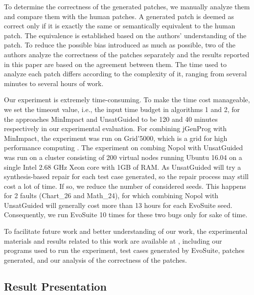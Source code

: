 \documentclass[]{sig-alternate}
\begin{document}
To determine the correctness of the generated patches, we manually analyze them and compare them with the human patches. A generated patch is deemed as correct only if it is exactly the same or semantically equivalent to the human patch. The equivalence is established based on the authors' understanding of the patch. To reduce the possible bias introduced as much as possible, two of the authors analyze the correctness of the patches separately and the results reported in this paper are based on the agreement between them. The time used to analyze each patch differs according to the complexity of it, ranging from several minutes to several hours of work. 

Our experiment is extremely time-consuming. To make the time cost manageable, we set the timeout value, i.e., the input time budget in algorithms 1 and 2, for the approaches MinImpact and UnsatGuided to be 120 and 40 minutes respectively in our experimental evaluation. For combining jGenProg with MinImpact, the experiment was run on Grid’5000, which is a grid for high performance computing \cite{bolze2006grid}. The experiment on combing Nopol with UnsatGuided was run on a cluster consisting of 200 virtual nodes running Ubuntu 16.04 on a single Intel 2.68 GHz Xeon core with 1GB of RAM. As UnsatGuided will try a synthesis-based repair for each test case generated, so the repair process may still cost a lot of time. If so, we reduce the number of considered seeds. This happens for 2 faults (Chart\_26 and Math\_24), for which combining Nopol with UnsatGuided will generally cost more than 13 hours for each EvoSuite seed. Consequently, we run EvoSuite 10 times for these two bugs only for sake of time.

To facilitate future work and better understanding of our work, the experimental materials and results related to this work are available at \cite{replication-site}, including our programs used to run the experiment, test cases generated by EvoSuite, patches generated, and our analysis of the correctness of the patches. 


\subsection{Result Presentation}
\end{document}
